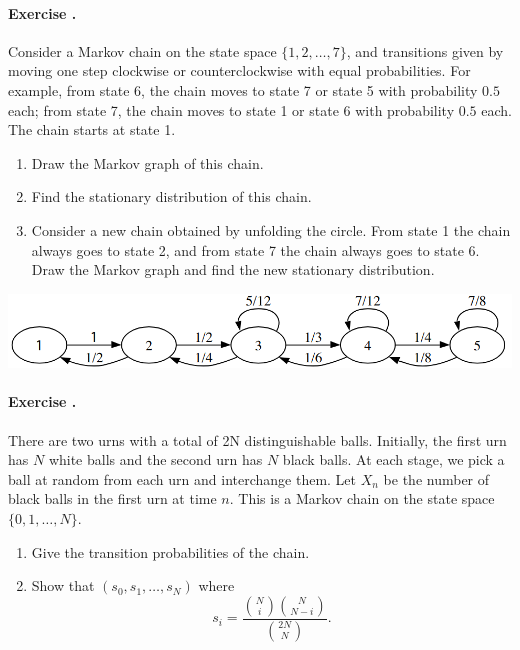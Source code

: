 \documentclass[12pt,a4paper]{article}
\newcounter{num}  %
\begin{document}
\paragraph{Exercise \thenum.}%
Consider a Markov chain on the state space $\{1, 2,\ldots, 7\}$, and transitions given by moving one step clockwise or counterclockwise with equal probabilities. For example, from state 6, the chain moves
to state 7 or state 5 with probability $0.5$ each; from state 7, the chain moves to state 1
or state 6 with probability $0.5$ each. 
The chain starts at state 1.
\begin{enumerate}
	\item Draw the Markov graph of this chain.
	\item Find the stationary distribution of this chain.
	\item Consider a new chain obtained by unfolding the circle. 
	From state 1 the chain always goes to state 2, and from state 7 the	chain always goes to state 6. 
	Draw the Markov graph and find the new stationary distribution.
\end{enumerate}
\includegraphics[width = .6\textwidth]{images/markov_rev.png}




\paragraph{Exercise \thenum.}
There are two urns with a total of 2N distinguishable balls. Initially, the first urn has $N$ white balls and the second urn has $N$ black balls. At each stage, we pick a ball at random from each urn and interchange them. Let $X_n$ be the number of black balls in the first urn at time $n$. 
This is a Markov chain on the state space $\{0, 1,\ldots, N \}$.
\begin{enumerate}
	\item Give the transition probabilities of the chain.
	\item Show that $(s_0, s_1,\ldots, s_N)$ where
	\begin{equation}
		s_i = \frac{\binom{N}{i}\binom{N}{N-i}}{\binom{2N}{N}}.
	\end{equation}
\end{enumerate}

\end{document}
